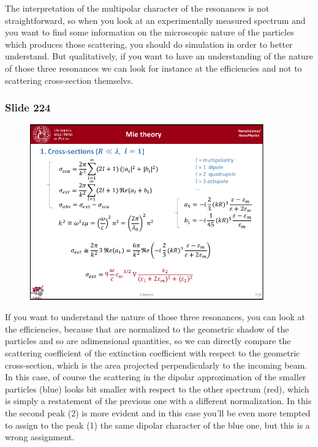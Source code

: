 \documentclass[../main/main.tex]{subfiles}
\begin{document}
The interpretation of the multipolar character of the resonances is not straightforward, so when you look at an experimentally measured spectrum and you want to find some information on the microscopic nature of the particles which produces those scattering, you should do simulation in order to better understand.
But qualitatively, if you want to have an understanding of the nature of those three resonances we can look for instance at the efficiencies and not to scattering cross-section themselvs.

\newpage
\subsubsection{Slide 224}

\begin{figure}[h!]
\centering
\includegraphics[page=7,width=0.9\textwidth]{../lessons/pdf_file/14_lesson.pdf}
\end{figure}

If you want to understand the nature of those three resonances, you can look at the efficiencies, because
that are  normalized to the geometric shadow of the particles and so are adimensional quantities, so we can directly compare the scattering coefficient of the extinction coefficient with respect to the geometric cross-section, which is the area projected perpendicularly to the incoming beam.
In this case, of course the scattering in the dipolar approximation of the smaller particles (blue) looks bit smaller with respect to the other spectrum (red), which is simply a restatement of the previous one with a different normalization. In this the second peak (2) is more evident and in this case you'll be even more tempted to assign to the peak (1) the same dipolar character of the blue one, but this is a wrong assignment.
\end{document}
